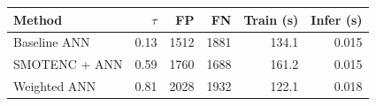 \begin{tabular}{lrrrrr}
\toprule Method & $\tau$ & FP & FN & Train (s) & Infer (s) \\
\midrule
Baseline ANN & 0.13 & 1512 & 1881 & 134.1 & 0.015 \\
SMOTENC + ANN & 0.59 & 1760 & 1688 & 161.2 & 0.015 \\
Weighted ANN & 0.81 & 2028 & 1932 & 122.1 & 0.018 \\
\bottomrule
\end{tabular}